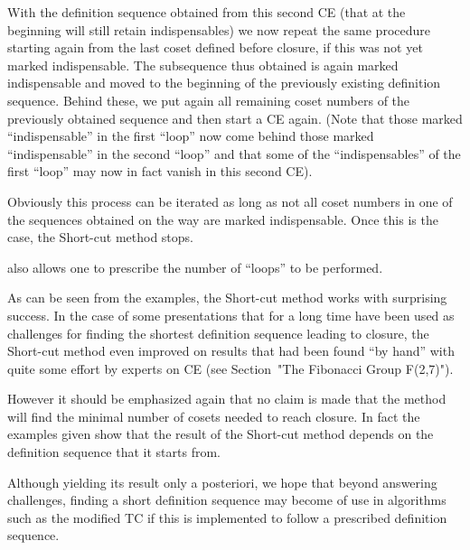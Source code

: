 With the definition sequence obtained from this second CE (that at the
beginning will still retain indispensables) we now repeat the same
procedure starting again from the last coset defined before closure,
if this was not yet marked indispensable. The subsequence thus
obtained is again marked indispensable and moved to the beginning of
the previously existing definition sequence. Behind these, we put
again all remaining coset numbers of the previously obtained sequence
and then start a CE again. (Note that those marked ``indispensable'' in
the first ``loop'' now come behind those marked ``indispensable'' in the
second ``loop'' and that some of the ``indispensables'' of the first
``loop'' may now in fact vanish in this second CE).

Obviously this process can be iterated as long as not all coset
numbers in one of the sequences obtained on the way are marked
indispensable. Once this is the case, the Short-cut method stops.

{\ITC} also allows one to prescribe the number of ``loops'' to be
performed.

As can be seen from the examples, the Short-cut method works
with surprising success. In the case of some presentations that for
a long time have been used as challenges for finding the shortest
definition sequence leading to closure, the Short-cut method even
improved on results that had been found ``by hand'' with quite some
effort by experts on CE (see Section~"The Fibonacci Group F(2,7)").

However it should be emphasized again that no claim is made that the
method will find the minimal number of cosets needed to reach closure.
In fact the examples given show that the result of the Short-cut
method depends on the definition sequence that it starts from.

Although yielding its result only a posteriori, we hope that beyond
answering challenges, finding a short definition sequence may become
of use in algorithms such as the modified TC if this is implemented to
follow a prescribed definition sequence.



